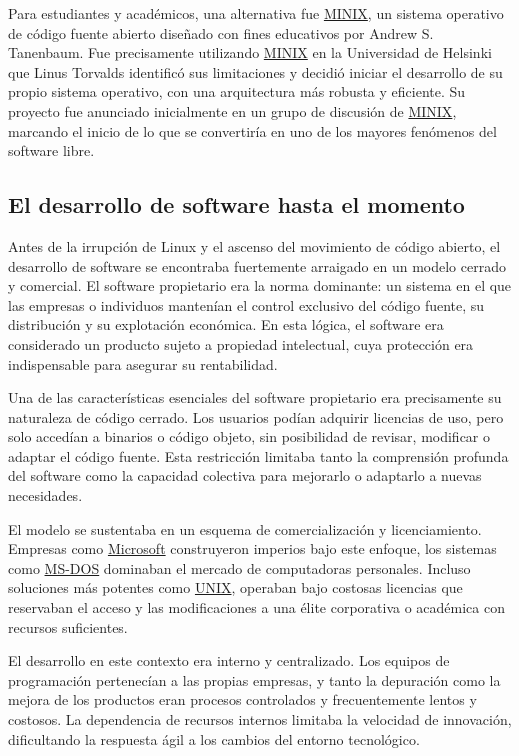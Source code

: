\documentclass[a4paper,12pt]{article}
\begin{document}
Para estudiantes y académicos, una alternativa fue \hyperref[minix]{MINIX}, un sistema operativo
de código fuente abierto diseñado con fines educativos por Andrew S. Tanenbaum.
Fue precisamente utilizando \hyperref[minix]{MINIX} en la Universidad de Helsinki que Linus
Torvalds identificó sus limitaciones y decidió iniciar el desarrollo de su
propio sistema operativo, con una arquitectura más robusta y eficiente. Su
proyecto fue anunciado inicialmente en un grupo de discusión de \hyperref[minix]{MINIX}, marcando
el inicio de lo que se convertiría en uno de los mayores fenómenos del software
libre.


\subsection{El desarrollo de software hasta el momento}

Antes de la irrupción de Linux y el ascenso del movimiento de código abierto, el
desarrollo de software se encontraba fuertemente arraigado en un modelo cerrado
y comercial. El software propietario era la norma dominante: un sistema en el
que las empresas o individuos mantenían el control exclusivo del código fuente,
su distribución y su explotación económica. En esta lógica, el software era
considerado un producto sujeto a propiedad intelectual, cuya protección era
indispensable para asegurar su rentabilidad.

Una de las características esenciales del software propietario era precisamente
su naturaleza de código cerrado. Los usuarios podían adquirir licencias de uso,
pero solo accedían a binarios o código objeto, sin posibilidad de revisar,
modificar o adaptar el código fuente. Esta restricción limitaba tanto la
comprensión profunda del software como la capacidad colectiva para mejorarlo o
adaptarlo a nuevas necesidades.

El modelo se sustentaba en un esquema de comercialización y licenciamiento.
Empresas como \hyperref[microsoft]{Microsoft} construyeron imperios bajo este enfoque, los sistemas
como \hyperref[msdos]{MS-DOS} dominaban el mercado de computadoras personales. Incluso soluciones
más potentes como \hyperref[unix]{UNIX}, operaban bajo costosas licencias que reservaban el
acceso y las modificaciones a una élite corporativa o académica con recursos
suficientes.

El desarrollo en este contexto era interno y centralizado. Los equipos de
programación pertenecían a las propias empresas, y tanto la depuración como la
mejora de los productos eran procesos controlados y frecuentemente lentos y
costosos. La dependencia de recursos internos limitaba la velocidad de
innovación, dificultando la respuesta ágil a los cambios del entorno
tecnológico.
\end{document}

